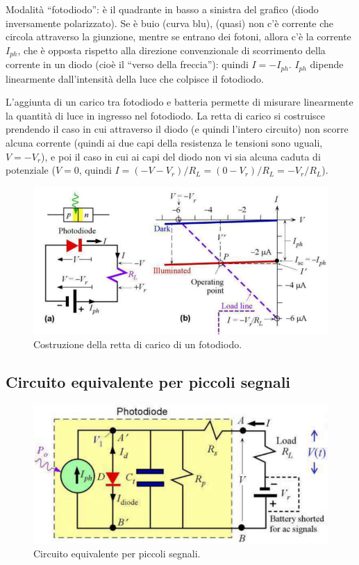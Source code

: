\documentclass[a4paper,11pt]{article}
\begin{document}
Modalità ``fotodiodo'': è il quadrante in basso a sinistra del grafico (diodo inversamente polarizzato).
Se è buio (curva blu), (quasi) non c'è corrente che circola attraverso la giunzione, mentre se entrano dei fotoni,
allora c'è la corrente $I_{ph}$, che è opposta rispetto alla direzione convenzionale di scorrimento della corrente in un diodo
(cioè il ``verso della freccia''): quindi $I = -I_{ph}$.
$I_{ph}$ dipende linearmente dall'intensità della luce che colpisce il fotodiodo.
\par
L'aggiunta di un carico tra fotodiodo e batteria permette di misurare linearmente la quantità di luce in ingresso
nel fotodiodo. La retta di carico si costruisce prendendo il caso in cui attraverso il diodo (e quindi l'intero circuito) non
scorre alcuna corrente (quindi ai due capi della resistenza le tensioni sono uguali, $V = -V_{r}$), e poi il caso in cui
ai capi del diodo non vi sia alcuna caduta di potenziale ($V = 0$, quindi $I = (-V -V_r) / R_L = (0 - V_r)/R_L = -V_r / R_L$).

\renewcommand{\thefigure}{3.4}
\begin{figure}[!h]
  \centering
    \includegraphics[scale=0.55]{images/3/load_line.png}
    \caption{Costruzione della retta di carico di un fotodiodo.}
\end{figure}


\subsection{Circuito equivalente per piccoli segnali}

\renewcommand{\thefigure}{3.5}
\begin{figure}[!h]
  \centering
    \includegraphics[scale=0.55]{images/3/equivalent.png}
    \caption{Circuito equivalente per piccoli segnali.}
\end{figure}
\end{document}
